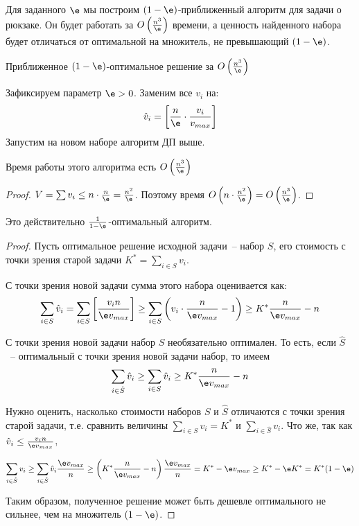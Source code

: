 Для заданного $\e$ мы построим $(1-\e)$-приближенный алгоритм для задачи о рюкзаке.
Он будет работать за $O\left(\frac{n^3}{\e}\right)$ времени, а ценность найденного набора будет отличаться от оптимальной на множитель, не превышающий $(1-\e)$.

\begin{algodescription}{Приближенное $(1-\e)$-оптимальное решение за $O\left(\frac{n^3}{\e}\right)$}

Зафиксируем параметр $\e>0$. Заменим все $v_i$ на: $$\hat{v}_i = \left[\frac{n}{\e} \cdot \frac{v_i}{v_{max}}\right]$$ Запустим на новом наборе алгоритм ДП выше.
\end{algodescription}

\begin{theorem*}
    Время работы этого алгоритма есть $O\left(\frac{n^3}{\e}\right)$
\end{theorem*}
\begin{proof}
    $V = \sum v_i \leq n\cdot \frac{n}{\e} = \frac{n^2}{\e}$. Поэтому время $O\left(n \cdot \frac{n^2}{\e}\right) = O\left(\frac{n^3}{\e}\right)$.
\end{proof}

\begin{theorem*}
    Это действительно $\frac{1}{1-\e}$-оптимальный алгоритм.
\end{theorem*}
\begin{proof}
Пусть оптимальное решение исходной задачи~-- набор $S$, его стоимость с точки зрения старой задачи $K^* = \sum\limits_{i\in S} v_i$.

С точки зрения новой задачи сумма этого набора оценивается как:
$$\sum_{i\in S}\hat{v}_i = \sum_{i\in S} \left[\frac{v_i n}{\e v_{max}}\right] \geq \sum_{i\in S} \left(v_i \cdot \frac{n}{\e v_{max}} - 1\right) \geq K^*\frac{n}{\e v_{max}} - n$$

С точки зрения новой задачи набор $S$ необязательно оптимален. То есть, если $\hat{S}$~-- оптимальный с точки зрения новой задачи набор, то имеем $$\sum_{i\in\hat S}\hat{v}_i \geq \sum_{i\in S} \hat{v}_i \geq K^*\frac{n}{\e v_{max}} - n$$

Нужно оценить, насколько стоимости наборов $S$ и $\hat S$ отличаются с точки зрения старой задачи, т.е. сравнить величины $\sum\limits_{i\in S}v_i = K^*$ и $\sum\limits_{i\in\hat S}v_i$. Что же, так как $\hat{v}_i \leq \frac{v_i n}{\e v_{max}}$,

$$\sum_{i\in\hat S}v_i \geq \sum_{i\in\hat S} \hat{v}_i \frac{\e v_{max}}{n} \geq \left(K^*\frac{n}{\e v_{max}} - n\right)\frac{\e v_{max}}{n} = K^* - \e v_{max} \geq K^* - \e K^* = K^*(1-\e)$$

Таким образом, полученное решение может быть дешевле оптимального не сильнее, чем на множитель $(1-\e)$.
\end{proof}
